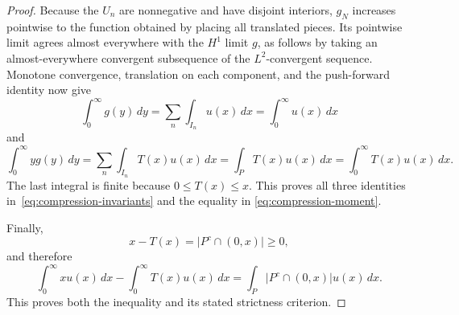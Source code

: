 \documentclass[11pt]{amsart}
\theoremstyle{definition}
\theoremstyle{remark}
\begin{document}
\begin{proof}
Because the $U_n$ are nonnegative and have disjoint interiors, $g_N$ increases
pointwise to the function obtained by placing all translated pieces. Its
pointwise limit agrees almost everywhere with the $H^1$ limit $g$, as follows
by taking an almost-everywhere convergent subsequence of the $L^2$-convergent
sequence. Monotone convergence, translation on each component, and the
push-forward identity now give
\[
 \int_0^\infty g(y)\,dy
 =\sum_n\int_{I_n}u(x)\,dx
 =\int_0^\infty u(x)\,dx
\]
and
\[
 \int_0^\infty yg(y)\,dy
 =\sum_n\int_{I_n}T(x)u(x)\,dx
 =\int_P T(x)u(x)\,dx
 =\int_0^\infty T(x)u(x)\,dx.
\]
The last integral is finite because $0\leq T(x)\leq x$. This proves all three
identities in~\eqref{eq:compression-invariants} and the equality in
\eqref{eq:compression-moment}.

Finally,
\[
 x-T(x)=\bigl|P^c\cap(0,x)\bigr|\geq0,
\]
and therefore
\[
 \int_0^\infty xu(x)\,dx-\int_0^\infty T(x)u(x)\,dx
 =\int_P\bigl|P^c\cap(0,x)\bigr|u(x)\,dx.
\]
This proves both the inequality and its stated strictness criterion.
\end{proof}
\end{document}
